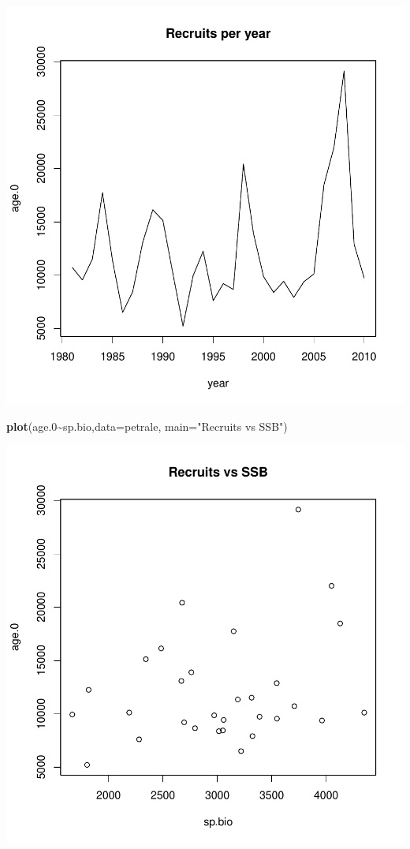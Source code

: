 \documentclass[
]{article}
\newenvironment{Shaded}{\begin{snugshade}}{\end{snugshade}}
\newcommand{\DataTypeTok}[1]{\textcolor[rgb]{0.13,0.29,0.53}{#1}}
\newcommand{\FloatTok}[1]{\textcolor[rgb]{0.00,0.00,0.81}{#1}}
\newcommand{\KeywordTok}[1]{\textcolor[rgb]{0.13,0.29,0.53}{\textbf{#1}}}
\newcommand{\NormalTok}[1]{#1}
\newcommand{\OperatorTok}[1]{\textcolor[rgb]{0.81,0.36,0.00}{\textbf{#1}}}
\newcommand{\StringTok}[1]{\textcolor[rgb]{0.31,0.60,0.02}{#1}}
\begin{document}
\includegraphics{calcurr_files/figure-latex/unnamed-chunk-1-1.pdf}

\begin{Shaded}
\begin{Highlighting}[]
\KeywordTok{plot}\NormalTok{(age}\FloatTok{.0}\OperatorTok{\textasciitilde{}}\NormalTok{sp.bio,}\DataTypeTok{data=}\NormalTok{petrale, }\DataTypeTok{main=}\StringTok{"Recruits vs SSB"}\NormalTok{)}
\end{Highlighting}
\end{Shaded}

\includegraphics{calcurr_files/figure-latex/unnamed-chunk-1-2.pdf}
\end{document}

